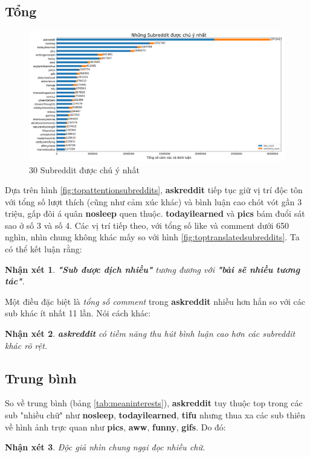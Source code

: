 \documentclass[10pt,a4paper]{article}
\newtheorem{remark}{Nhận xét}
\begin{document}
\subsection{Tổng}
\begin{figure}[!h]
    \centering
    \includegraphics[width=\textwidth]{img/TopAttentionSubreddits.png}
    \caption{30 Subreddit được chú ý nhất}
    \label{fig:topattentionsubreddits}
\end{figure}

Dựa trên hình \eqref{fig:topattentionsubreddits}, \textbf{askreddit} tiếp tục giữ vị trí độc tôn với tổng số lượt thích (cũng như cảm xúc khác) và bình luận cao chót vót gần 3 triệu, gấp đôi á quân \textbf{nosleep} quen thuộc. \textbf{todayilearned} và \textbf{pics} bám đuổi sát sao ở số 3 và số 4. Các vị trí tiếp theo, với tổng số like và comment dưới 650 nghìn, nhìn chung không khác mấy so với hình \eqref{fig:toptranslatedsubreddits}. Ta có thể kết luận rằng:
\begin{remark}
    \label{re:attentionandtranslation}
    \textbf{"Sub được dịch nhiều"} tương đương với \textbf{"bài sẽ nhiều tương tác"}.
\end{remark}

Một điều đặc biệt là \emph{tổng số comment} trong \textbf{askreddit} nhiều hơn hẳn so với các sub khác ít nhất 11 lần. Nói cách khác:
\begin{remark}
    \label{re:askredditpotential}
    \textbf{askreddit} có tiềm năng thu hút bình luận cao hơn các subreddit khác rõ rệt.
\end{remark}
\subsection{Trung bình}
So về trung bình (bảng \eqref{tab:meaninterests}), \textbf{askreddit} tuy thuộc top trong các sub "nhiều chữ" như \textbf{nosleep}, \textbf{todayilearned}, \textbf{tifu} nhưng thua xa các sub thiên về hình ảnh trực quan như \textbf{pics}, \textbf{aww}, \textbf{funny}, \textbf{gifs}. Do đó:
\begin{remark}
    \label{re:toomuchwords}
    Độc giả nhìn chung ngại đọc nhiều chữ.
\end{remark}
\end{document}
